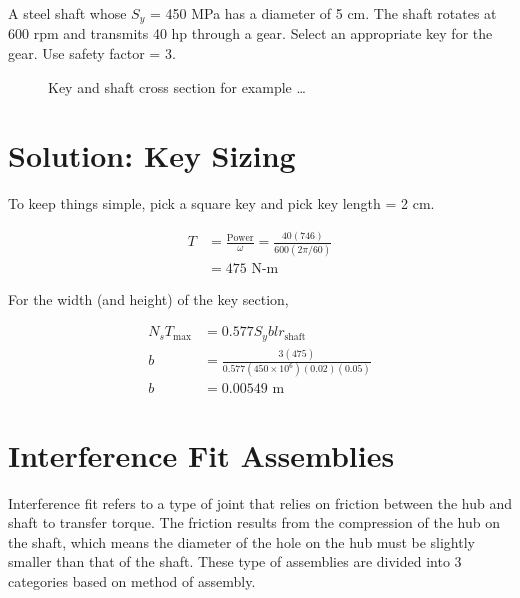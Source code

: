 \documentclass[a4paper,openany]{tufte-book}
\begin{document}
A steel shaft whose \(S_y\) = 450 MPa has a diameter of 5 cm. The shaft rotates at 600 rpm and transmits 40 hp through a gear. Select an appropriate key for the gear. Use safety factor = 3.

\begin{figure}[htbp]
  \centering
\caption{Key and shaft cross section for example \ldots{}}
\end{figure}

\section{Solution: Key Sizing}
\label{sec:orgf4414d6}

To keep things simple, pick a square key and pick key length = 2 cm.

\begin{align*}
  T &= \frac{\text{Power}}{\omega} = \frac{40(746)}{600(2\pi/60)} \\
    &= 475 \text{ N-m}
\end{align*}

For the width (and height) of the key section,

\begin{align*}
  N_{s} T_{\max} &= 0.577S_{y}blr_{\text{shaft}} \\
  b &= \frac{3(475)}{0.577(450 \times 10^{6})(0.02)(0.05)} \\
  b &= 0.00549 \text{ m}
\end{align*}

\section{Interference Fit Assemblies}
\label{sec:org763fd49}

Interference fit refers to a type of joint that relies on friction between the hub and shaft to transfer torque. The friction results from the compression of the hub on the shaft, which means the diameter of the hole on the hub must be slightly smaller than that of the shaft. These type of assemblies are divided into 3 categories based on method of assembly.
\end{document}

